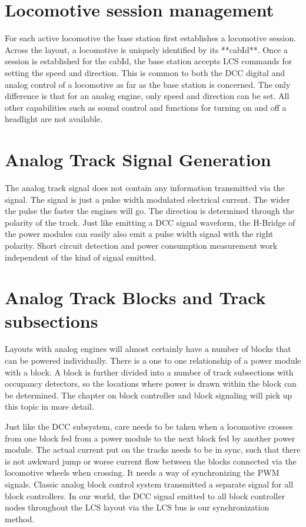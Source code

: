 \section{Locomotive session management}

For each active locomotive the base station first establishes a locomotive session. Across the layout, a locomotive is uniquely identified by its **cabId**. Once a session is established for the cabId, the base station accepts LCS commands for setting the speed and direction. This is common to both the DCC digital and analog control of a locomotive as far as the base station is concerned. The only difference is that for an analog engine, only speed and direction can be set. All other capabilities such as sound control and functions for turning on and off a headlight are not available.

\section{Analog Track Signal Generation}

The analog track signal does not contain any information transmitted via the signal. The signal is just a pulse width modulated electrical current. The wider the pulse the faster the engines will go. The direction is determined through the polarity of the track. Just like emitting a DCC signal waveform, the H-Bridge of the power modules can easily also emit a pulse width signal with the right polarity. Short circuit detection and power consumption measurement work independent of the kind of signal emitted.

\section{Analog Track Blocks and Track subsections}

Layouts with analog engines will almost certainly have a number of blocks that can be powered individually. There is a one to one relationship of a power module with a block. A block is further divided into a number of track subsections with occupancy detectors, so the locations where power is drawn within the block can be determined. The chapter on block controller and block signaling will pick up this topic in more detail.

Just like the DCC subsystem, care needs to be taken when a locomotive crosses from one block fed from a power module to the next block fed by another power module. The actual current put on the tracks needs to be in sync, such that there is not awkward jump or worse current flow between the blocks connected via the locomotive wheels when crossing. It needs a way of synchronizing the PWM signals. Classic analog block control system transmitted a separate signal for all block controllers. In our world, the DCC signal emitted to all block controller nodes throughout the LCS layout via the LCS bus is our synchronization method.

